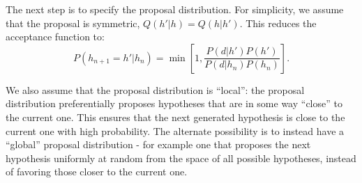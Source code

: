 
The next step is to specify the proposal distribution. For simplicity, we assume that the proposal is symmetric, $Q(h'|h) = Q(h|h')$. This reduces the acceptance function to:
\begin{equation}
\label{eq:acceptance}
P(h_{n+1}=h'|h_n) = \min\left[1, \frac{P(d|h')P(h')}{P(d|h_n) P(h_n)} \right].
\end{equation}

We also assume that the proposal distribution is ``local'': the proposal distribution preferentially proposes hypotheses that are in some way ``close'' to the current one. This ensures that the next generated hypothesis is close to the current one with high probability. The alternate possibility is to instead have a ``global'' proposal distribution - for example one that proposes the next hypothesis uniformly at random from the space of all possible hypotheses, instead of favoring those closer to the current one.

